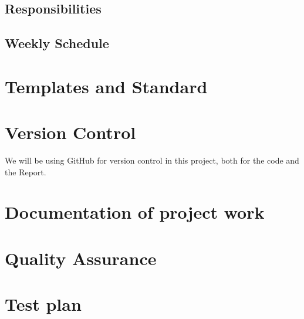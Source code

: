 \subsection{Responsibilities}
\subsection{Weekly Schedule}

\section{Templates and Standard}

\section{Version Control}
We will be using GitHub for version control in this project, both for the code and the Report.

\section{Documentation of project work}

\section{Quality Assurance}

\section{Test plan}